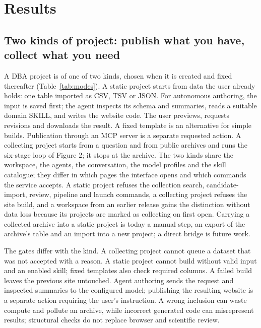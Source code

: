 \documentclass[11pt,a4paper]{article}
\begin{document}
\section{Results}\label{results}

\subsection{Two kinds of project: publish what you have, collect what
you need}\label{two-kinds}

A DBA project is of one of two kinds, chosen when it is created and
fixed thereafter (Table~\ref{tab:modes}). A static project starts from
data the user already holds: one table imported as CSV, TSV or JSON.
For autonomous authoring, the input is saved first; the agent inspects
its schema and summaries, reads a suitable domain SKILL, and writes the
website code. The user previews, requests revisions and downloads the
result. A fixed template is an alternative for simple builds.
Publication through an MCP server is a separate requested action.
A collecting project starts from a question and from public
archives and runs the six-stage loop of Figure 2; it stops at the
archive. The two kinds share the workspace, the agents, the
conversation, the model profiles and the skill catalogue; they differ in
which pages the interface opens and which commands the service accepts.
A static project refuses the collection search, candidate-import, review,
pipeline and launch
commands, a collecting project refuses the site build, and a workspace
from an earlier release gains the distinction without data loss because
its projects are marked as collecting on first open. Carrying a
collected archive into a static project is today a manual step, an
export of the archive's table and an import into a new project; a direct
bridge is future work.

The gates differ with the kind. A collecting project cannot queue a
dataset that was not accepted with a reason. A static project cannot
build without valid input and an enabled skill; fixed templates also
check required columns. A failed build leaves the previous site untouched.
Agent authoring sends the request and inspected summaries to the configured
model; publishing the resulting website is a separate action requiring
the user's instruction. A wrong inclusion can waste compute and pollute
an archive, while incorrect generated code can misrepresent results;
structural checks do not replace browser and scientific review.
\end{document}

